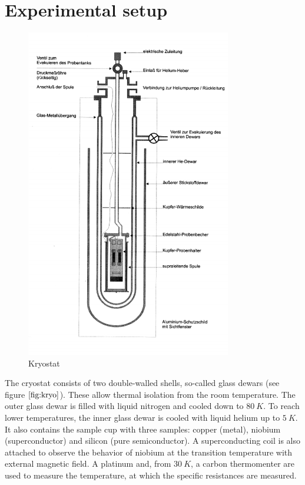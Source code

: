 
\section{Experimental setup}
\label{sec:setup}


\begin{figure}
    \centering
    \includegraphics[width=0.8\textwidth]{./fig/kryo.png}
    \caption{Kryostat}
    \label{fig:kryo}
\end{figure}

The cryostat consists of two double-walled shells, so-called glass dewars (see figure $\autoref{fig:kryo}$). These allow thermal isolation from the room temperature. The outer glass dewar is filled with liquid nitrogen and cooled down to $\SI{80}{K}$. To reach lower temperatures, the inner glass dewar is cooled with liquid helium up to $\SI{5}{K}$. It also contains the sample cup with three samples: copper (metal), niobium (superconductor) and silicon (pure semiconductor). A superconducting coil is also attached to observe the behavior of niobium at the transition temperature with external magnetic field. 
A platinum and, from $\SI{30}{K}$, a carbon thermomenter are used to measure the 
temperature, at which the specific resistances are measured.
